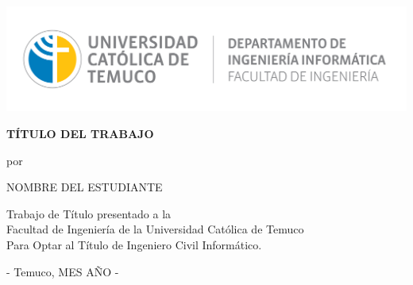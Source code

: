 \vspace*{-6\baselineskip}
\hspace*{-0.0\textwidth}\includegraphics[width=\textwidth]{images/Logo_depto_ing_informatica.png}\nonumber

\vspace{3cm}

\begin{center}
    \textbf{ TÍTULO DEL TRABAJO}
\end{center}
\vspace{3.5cm}

\begin{center}
por
\par\end{center}

\begin{center}
NOMBRE DEL ESTUDIANTE\vspace{3cm}
\par\end{center}

\begin{center}
Trabajo de Título presentado a la\\
Facultad de Ingeniería de la Universidad Católica de Temuco\\
Para Optar al Título de Ingeniero Civil Informático.
\par\end{center}
\begin{center}
- Temuco, MES AÑO -
\par\end{center}
